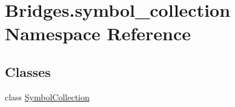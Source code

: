 \hypertarget{namespace_bridges_1_1symbol__collection}{}\section{Bridges.\+symbol\+\_\+collection Namespace Reference}
\label{namespace_bridges_1_1symbol__collection}
\subsection*{Classes}
\begin{DoxyCompactItemize}
\item 
class \mbox{\hyperlink{class_bridges_1_1symbol__collection_1_1_symbol_collection}{Symbol\+Collection}}
\end{DoxyCompactItemize}
